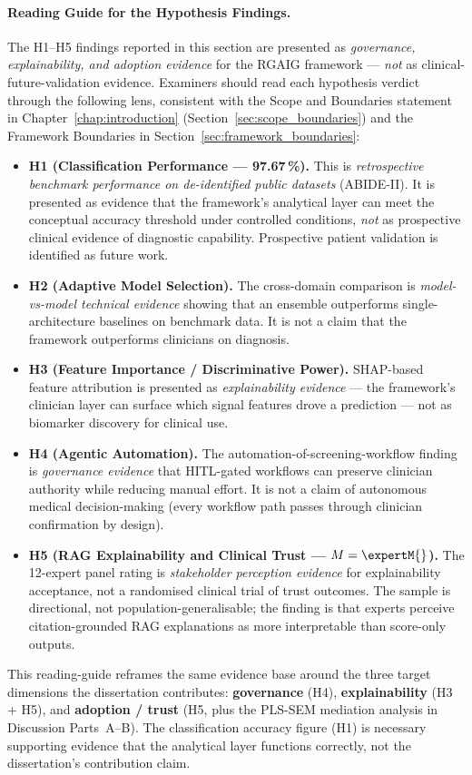 \paragraph{Reading Guide for the Hypothesis Findings.}
\label{para:ch5_findings_reading_guide}
The H1--H5 findings reported in this section are presented as \textit{governance, explainability, and adoption evidence} for the RGAIG framework --- \emph{not} as clinical-future-validation evidence. Examiners should read each hypothesis verdict through the following lens, consistent with the Scope and Boundaries statement in Chapter~\ref{chap:introduction} (Section~\ref{sec:scope_boundaries}) and the Framework Boundaries in Section~\ref{sec:framework_boundaries}:
\begin{itemize}[leftmargin=*, itemsep=3pt]
    \item \textbf{H1 (Classification Performance --- 97.67\,\%).} This is \emph{retrospective benchmark performance on de-identified public datasets} (ABIDE-II). It is presented as evidence that the framework's analytical layer can meet the conceptual accuracy threshold under controlled conditions, \emph{not} as prospective clinical evidence of diagnostic capability. Prospective patient validation is identified as future work.
    \item \textbf{H2 (Adaptive Model Selection).} The cross-domain comparison is \emph{model-vs-model technical evidence} showing that an ensemble outperforms single-architecture baselines on benchmark data. It is not a claim that the framework outperforms clinicians on diagnosis.
    \item \textbf{H3 (Feature Importance / Discriminative Power).} SHAP-based feature attribution is presented as \emph{explainability evidence} --- the framework's clinician layer can surface which signal features drove a prediction --- not as biomarker discovery for clinical use.
    \item \textbf{H4 (Agentic Automation).} The automation-of-screening-workflow finding is \emph{governance evidence} that HITL-gated workflows can preserve clinician authority while reducing manual effort. It is not a claim of autonomous medical decision-making (every workflow path passes through clinician confirmation by design).
    \item \textbf{H5 (RAG Explainability and Clinical Trust --- $M = \expertM{}$).} The 12-expert panel rating is \emph{stakeholder perception evidence} for explainability acceptance, not a randomised clinical trial of trust outcomes. The sample is directional, not population-generalisable; the finding is that experts perceive citation-grounded RAG explanations as more interpretable than score-only outputs.
\end{itemize}
This reading-guide reframes the same evidence base around the three target dimensions the dissertation contributes: \textbf{governance} (H4), \textbf{explainability} (H3 + H5), and \textbf{adoption / trust} (H5, plus the PLS-SEM mediation analysis in Discussion Parts~A--B). The classification accuracy figure (H1) is necessary supporting evidence that the analytical layer functions correctly, not the dissertation's contribution claim.

